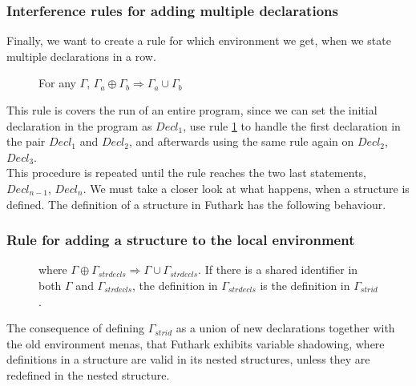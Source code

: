 \subsubsection{Interference rules for adding multiple declarations}
Finally, we want to create a rule for which environment we get, when we state
multiple declarations in a row.
\begin{figure}\label{Rule2multiple}
  \begin{tcolorbox}
    \begin{prooftree}
      \end{prooftree}
      For any $\Gamma$, $\Gamma_a \oplus \Gamma_b \Rightarrow \Gamma_a \cup \Gamma_b$
    \end{tcolorbox}
\end{figure}
This rule is covers the run of an entire program, since we can set the initial
declaration in the program as $Decl_1$, use rule \ref{Rule2multiple} to handle
the first declaration in the pair $Decl_1$ and $Decl_2$, and afterwards using
the same rule again on $Decl_2$, $Decl_3$.
\\
This procedure is repeated until the rule reaches the two last statements,
$Decl_{n-1}$, $Decl_n$. 
We must take a closer look at what happens, when a structure is defined.
The definition of a structure in Futhark has the following behaviour.
\subsubsection{Rule for adding a structure to the local environment}
\begin{figure}[h!]\label{Rule3}
  \begin{tcolorbox}
    \begin{prooftree}
    \end{prooftree}
    where $\Gamma \oplus \Gamma_{strdecls} \Rightarrow \Gamma \cup
    \Gamma_{strdecls}.$
    If there is a shared identifier in both $\Gamma$ and $\Gamma_{strdecls}$,
    the definition in $\Gamma_{strdecls}$ is the definition in $\Gamma_{strid}$.
  \end{tcolorbox}
\end{figure}
The consequence of defining $\Gamma_{strid}$ as a union of new declarations together with the old environment menas, that Futhark exhibits variable shadowing, where definitions in a structure are valid in its nested structures, unless they are redefined in the nested structure.


